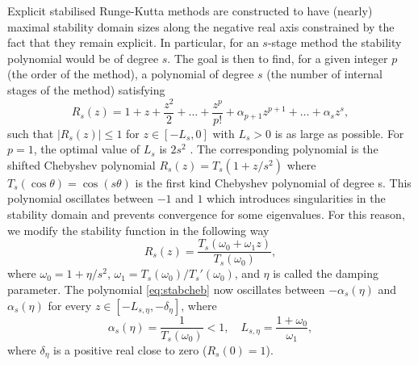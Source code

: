 \documentclass[10pt,a4paper]{article}
\begin{document}
        
        
        Explicit stabilised Runge-Kutta methods are constructed to have (nearly) maximal stability domain sizes along the negative real axis constrained by the fact that they remain explicit. In particular,  for an $s$-stage method the stability polynomial would be of degree $s$. The goal is then  to find, for a given integer $p$ (the order of the method), a polynomial of degree $s$ (the number of internal stages of the method) satisfying 
        \begin{equation*}
            R_s(z)=1+z+\frac{z^2}2+\dots+\frac{z^p}{p!}+\alpha_{p+1}z^{p+1}+\dots+\alpha_sz^s,
        \end{equation*}
        such that $|R_s(z)|\leq1$ for $z\in [-L_s,0]$ with $L_s>0$ is as large as possible. For $p=1$, the optimal value of $L_s$ is $2s^2$ \cite{Abdrev,HaW96}. The corresponding polynomial is the shifted Chebyshev polynomial $R_s(z)=T_s(1+z/s^2)$ where $T_s(\cos\theta) = \cos(s\theta)$ is the first kind Chebyshev polynomial of degree s. This polynomial oscillates between $-1$ and $1$ which introduces singularities in the stability domain and prevents convergence for some eigenvalues. For this reason, we modify the stability function in the following way
        \begin{equation}\label{eq:stabcheb}
            R_s(z)=\frac{T_s(\omega_0+\omega_1z)}{T_s(\omega_0)},
        \end{equation}
        where $\omega_0=1+\eta/s^2$, $\omega_1=T_s(\omega_0)/T_s'(\omega_0)$, and $\eta$ is called the damping parameter. The polynomial \eqref{eq:stabcheb} now oscillates between $-\alpha_s(\eta)$ and $\alpha_s(\eta)$ for every $z\in[-L_{s,\eta},-\delta_\eta]$, where
        \begin{equation}\label{eq:alphaL}
            \alpha_s(\eta)=\frac1{T_s(\omega_0)}<1, \quad L_{s,\eta}=\frac{1+\omega_0}{\omega_1},
        \end{equation}
        where $\delta_\eta$ is a positive real close to zero ($R_s(0)=1$). %
\end{document}
